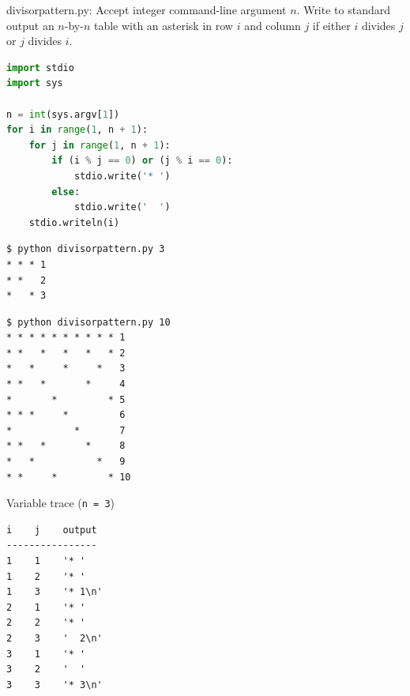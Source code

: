 \documentclass[8pt,a4paper,compress]{beamer}
\begin{document}
\begin{frame}[fragile]
\pause

\begin{framed}
\tiny divisorpattern.py: Accept integer command-line argument $n$. Write to standard output an $n$-by-$n$ table with an asterisk in row $i$ and column $j$ if either $i$ divides $j$ or $j$ divides $i$.
\end{framed}

\begin{lstlisting}[language=Python]
import stdio
import sys

n = int(sys.argv[1])
for i in range(1, n + 1):
    for j in range(1, n + 1):
        if (i % j == 0) or (j % i == 0):
            stdio.write('* ')
        else:
            stdio.write('  ')
    stdio.writeln(i)
\end{lstlisting}

\pause

\begin{minipage}{150pt}
\begin{lstlisting}[language={}]
$ python divisorpattern.py 3
* * * 1
* *   2
*   * 3
\end{lstlisting}
\begin{lstlisting}[language={}]
$ python divisorpattern.py 10
* * * * * * * * * * 1
* *   *   *   *   * 2
*   *     *     *   3
* *   *       *     4
*       *         * 5
* * *     *         6
*           *       7
* *   *       *     8
*   *           *   9
* *     *         * 10
\end{lstlisting}
\end{minipage}\hfill
\begin{minipage}{100pt}
Variable trace (\lstinline{n = 3})
\begin{lstlisting}[language={}]
i    j    output
----------------
1    1    '* '
1    2    '* '
1    3    '* 1\n'
2    1    '* '
2    2    '* '
2    3    '  2\n'
3    1    '* '
3    2    '  '  
3    3    '* 3\n'
\end{lstlisting}
\end{minipage}
\end{frame}
\end{document}
